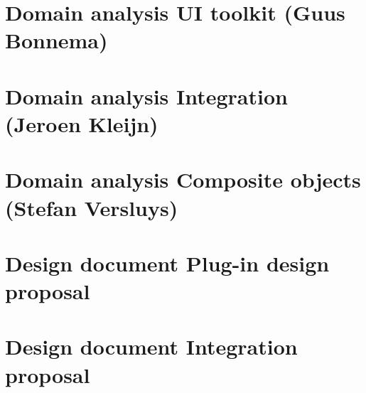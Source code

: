 \chapter{Domain analysis UI toolkit (Guus Bonnema)}


\chapter{Domain analysis Integration (Jeroen Kleijn)}


\chapter{Domain analysis Composite objects (Stefan Versluys)}


\chapter{Design document Plug-in design proposal}


\chapter{Design document Integration proposal}


\graphicspath{ {../07-reports/} }


